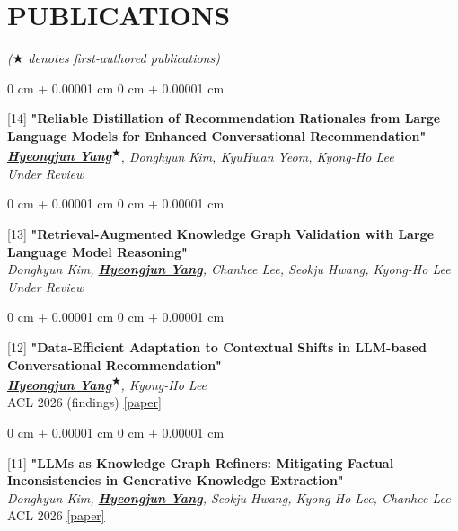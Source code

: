 \documentclass[10pt, letterpaper]{article}
\newenvironment{onecolentry}{
	\begin{adjustwidth}{
			0 cm + 0.00001 cm
		}{
			0 cm + 0.00001 cm
		}
	}{
	\end{adjustwidth}
} %
\begin{document}
	
	\section{PUBLICATIONS}
	{\footnotesize \textit{(\underline{$\bigstar$} denotes first-authored publications)}}
	
	
		\begin{samepage}
			
		\vspace{0.10 cm}
		\begin{onecolentry}
			[14] \textbf{"Reliable Distillation of Recommendation Rationales from Large Language Models for Enhanced Conversational Recommendation"}\\
			\textit{\textbf{\underline{Hyeongjun Yang\textsuperscript{$\bigstar$}}}, Donghyun Kim, KyuHwan Yeom, Kyong-Ho Lee}\\
			\vspace{0.05 cm}
			\textit{Under Review} 
		\end{onecolentry}			
			
		\vspace{0.20 cm}
		\begin{onecolentry}
			[13] \textbf{"Retrieval-Augmented Knowledge Graph Validation with Large Language Model Reasoning"}\\
			\textit{Donghyun Kim, \textbf{\underline{Hyeongjun Yang}}, Chanhee Lee, Seokju Hwang, Kyong-Ho Lee}\\
			\vspace{0.05 cm}
			\textit{Under Review} 
		\end{onecolentry}
		
		\vspace{0.20 cm}
		\begin{onecolentry}
			[12] \textbf{"Data-Efficient Adaptation to Contextual Shifts in LLM-based Conversational Recommendation"}\\
			\textit{\textbf{\underline{Hyeongjun Yang\textsuperscript{$\bigstar$}}}, Kyong-Ho Lee}\\
			\vspace{0.05 cm}
			ACL 2026 (findings)
			\href{https://2026.aclweb.org}{[paper]}
		\end{onecolentry}	
		
		\vspace{0.20 cm}
		\begin{onecolentry}
			[11] \textbf{"LLMs as Knowledge Graph Refiners: Mitigating Factual Inconsistencies in Generative Knowledge Extraction"}\\
			\textit{Donghyun Kim, \textbf{\underline{Hyeongjun Yang}}, Seokju Hwang, Kyong-Ho Lee, Chanhee Lee}\\
			\vspace{0.05 cm}
			ACL 2026
			\href{https://2026.aclweb.org}{[paper]}
		\end{onecolentry}	


\end{samepage}
\end{document}
